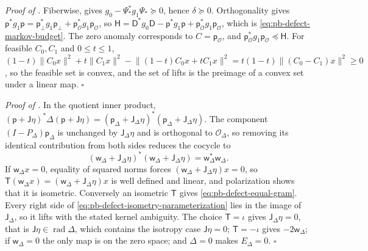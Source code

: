 \noindent\emph{Proof of .}
Fiberwise,  gives \(g_0-\Psi_*^*g_1\Psi_*\succeq0\), hence
\(\delta\succeq0\). Orthogonality gives
\(\mathsf p^*g_1\mathsf p=\mathsf p_\perp^*g_1\mathsf p_\perp+\mathsf p_{\mathcal O}^*g_1\mathsf p_{\mathcal O}\),
so \(\mathsf H=\mathsf D^*g_0\mathsf D-\mathsf p^*g_1\mathsf p+\mathsf p_{\mathcal O}^*g_1\mathsf p_{\mathcal O}\),
which is \eqref{eq:pb-defect-markov-budget}. The zero anomaly corresponds to \(C=\mathsf p_{\mathcal O}\),
and \(\mathsf p_{\mathcal O}^*g_1\mathsf p_{\mathcal O}\preceq\mathsf H\). For feasible \(C_0,C_1\) and
\(0\leq t\leq1\),
\((1-t)\lVert C_0x\rVert^2+t\lVert C_1x\rVert^2-\lVert(1-t)C_0x+tC_1x\rVert^2=t(1-t)\lVert(C_0-C_1)x\rVert^2\geq0\),
so the feasible set is convex, and the set of lifts is the preimage of a convex set under a linear map.
\hfill$\square$

\noindent\emph{Proof of .}
In the quotient inner product,
\((\mathsf p+\mathsf J\eta)^*\Delta(\mathsf p+\mathsf J\eta)=(\mathsf p_\Delta+\mathsf J_\Delta\eta)^*(\mathsf p_\Delta+\mathsf J_\Delta\eta)\).
The component \((I-P_\Delta)\mathsf p_\Delta\) is unchanged by \(\mathsf J_\Delta\eta\) and is orthogonal
to \(\mathcal O_\Delta\), so removing its identical contribution from both sides reduces the cocycle to
\begin{equation}
(\mathsf w_\Delta+\mathsf J_\Delta\eta)^*(\mathsf w_\Delta+\mathsf J_\Delta\eta)=\mathsf w_\Delta^*\mathsf w_\Delta.
\label{eq:pb-defect-equal-gram}
\end{equation}
If \(\mathsf w_\Delta x=0\), equality of squared norms forces \((\mathsf w_\Delta+\mathsf J_\Delta\eta)x=0\),
so \(\mathsf T(\mathsf w_\Delta x)=(\mathsf w_\Delta+\mathsf J_\Delta\eta)x\) is well defined and linear,
and polarization shows that it is isometric. Conversely an isometric \(\mathsf T\) gives
\eqref{eq:pb-defect-equal-gram}. Every right side of \eqref{eq:pb-defect-isometry-parameterization} lies
in the image of \(\mathsf J_\Delta\), so it lifts with the stated kernel ambiguity. The choice
\(\mathsf T=\iota\) gives \(\mathsf J_\Delta\eta=0\), that is \(\mathsf J\eta\in\operatorname{rad}\Delta\),
which contains the isotropy case \(\mathsf J\eta=0\); \(\mathsf T=-\iota\) gives
\(-2\mathsf w_\Delta\); if \(\mathsf w_\Delta=0\) the only map is on the zero space; and \(\Delta=0\) makes
\(E_\Delta=0\). \hfill$\square$


